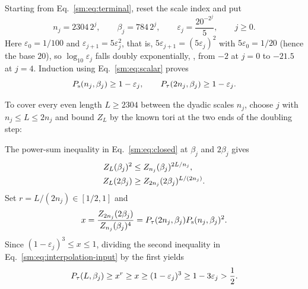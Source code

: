 Starting from Eq.~\eqref{sm:eq:terminal}, reset the scale index and put
\begin{equation}
 n_j=2304\,2^j,\qquad
 \beta_j=784\,2^j,\qquad
 \varepsilon_j=\frac{20^{-2^j}}5,\qquad j\ge0.
 \label{sm:eq:tail-scales}
\end{equation}
Here $\varepsilon_0=1/100$ and $\varepsilon_{j+1}=5\varepsilon_j^2$,
that is, $5\varepsilon_{j+1}=(5\varepsilon_j)^2$ with
$5\varepsilon_0=1/20$ (hence the base $20$), so $\log_{10}\varepsilon_j$
falls doubly exponentially,
, from $-2$ at $j=0$ to
$-21.5$ at $j=4$.
Induction using Eq.~\eqref{sm:eq:scalar} proves
\begin{equation}
 P_{\mathrm s}(n_j,\beta_j)\ge1-\varepsilon_j,\qquad
 P_{\tau}(2n_j,\beta_j)\ge1-\varepsilon_j.
 \label{sm:eq:tail}
\end{equation}

To cover every even length $L\ge2304$ between the dyadic scales $n_j$,
choose $j$ with $n_j\le L\le2n_j$ and bound $Z_L$ by the known tori at
the two ends of the doubling step:
\begin{proofdiagram}
 \dyadicinterval
\end{proofdiagram}
The power-sum inequality in Eq.~\eqref{sm:eq:closed} at $\beta_j$ and
$2\beta_j$ gives
\begin{align}
 Z_L(\beta_j)^2&\le Z_{n_j}(\beta_j)^{2L/n_j}, \notag\\
 Z_L(2\beta_j)&\ge Z_{2n_j}(2\beta_j)^{L/(2n_j)}.
 \label{sm:eq:interpolation-input}
\end{align}
Set $r=L/(2n_j)\in[1/2,1]$ and
\[
 x=\frac{Z_{2n_j}(2\beta_j)}{Z_{n_j}(\beta_j)^4}
   =P_{\tau}(2n_j,\beta_j)P_{\mathrm s}(n_j,\beta_j)^2.
\]
Since $(1-\varepsilon_j)^3\le x\le1$, dividing the second inequality in
Eq.~\eqref{sm:eq:interpolation-input} by the first yields
\begin{equation}
 P_{\tau}(L,\beta_j)\ge x^r\ge x
 \ge(1-\varepsilon_j)^3\ge1-3\varepsilon_j>\frac12.
 \label{sm:eq:interpolation}
\end{equation}

